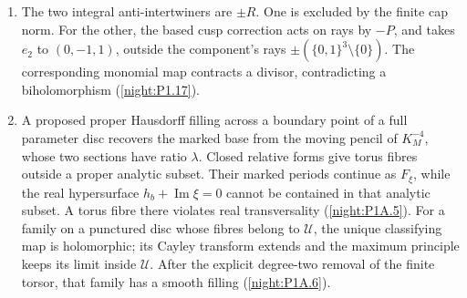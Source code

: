 \documentclass[11pt,a4paper]{article}
\numberwithin{equation}{section}
\theoremstyle{definition}
\begin{document}
\begin{enumerate}[label=\arabic*.,leftmargin=*]
\item\hypertarget{step-V-E-5}{} The two integral anti-intertwiners are $\pm R$.  One is excluded
  by the finite cap norm.  For the other, the based cusp
  correction acts on rays by $-P$, and takes $e_2$ to $(0,-1,1)$,
  outside the component's rays $\pm(\{0,1\}^3\setminus\{0\})$.
  The corresponding monomial map contracts a divisor, contradicting
  a biholomorphism (\cref{night:P1.17}).

\item\hypertarget{step-V-E-6}{} A proposed proper Hausdorff filling across a boundary point of
  a full parameter disc recovers the marked base from the moving
  pencil of $K_M^{-4}$, whose two sections have ratio $\lambda$.
  Closed relative forms give torus fibres outside a proper
  analytic subset.  Their marked periods continue as $F_\xi$,
  while the real hypersurface $h_b+\operatorname{Im}\xi=0$
  cannot be contained in that analytic subset.  A torus fibre
  there violates real transversality (\cref{night:P1A.5}).  For a family on a punctured disc whose
  fibres belong to $\mathcal U$, the unique classifying map is
  holomorphic; its Cayley transform extends and the maximum principle
  keeps its limit inside $\mathcal U$.  After the explicit degree-two
  removal of the finite torsor, that family has a smooth filling
  (\cref{night:P1A.6}).

\end{enumerate}

\hypertarget{outline-V-C}{}
\end{document}
